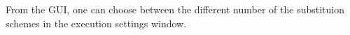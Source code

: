 \documentclass[10pt,twoside,a4paper]{article}
\begin{document}


From the GUI, one can choose between the different number of the substituion schemes in the execution settings window.






%
%
%
%
%

\end{document}
